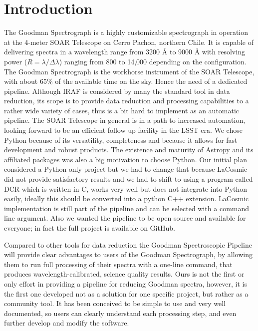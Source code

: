 \documentclass[11pt,twoside]{article}
\begin{document}
\section{Introduction}

The Goodman Spectrograph \citep{2004SPIE.5492..331C} is a highly customizable spectrograph in operation at
the 4-meter SOAR Telescope on Cerro Pachon, northern Chile.
It is capable of delivering spectra in a wavelength range from 3200 \AA{} to 9000 \AA{}
with resolving power ($R=\lambda/\Delta\lambda$) ranging from 800 to 14,000
depending on the configuration. The Goodman Spectrograph is the workhorse
instrument of the SOAR Telescope, with about 65\% of the available time on the sky.
Hence the need of a dedicated pipeline. Although IRAF is considered by many the standard tool
in data reduction, its scope is to provide data reduction and processing
capabilities to a rather wide variety of cases, thus is a bit hard to implement
as an automatic pipeline. The SOAR Telescope in general is in a path to increased automation, looking forward to be
an efficient follow up facility in the LSST era. We chose Python because of its
versatility, completeness and because it allows for fast development and
robust products. The existence and maturity of Astropy and its affiliated
packages was also a big motivation to choose Python.
Our initial plan considered a Python-only project but we had to change that
because LaCosmic \citep{2001PASP..113.1420V} did not provide satisfactory results and we had to shift
to using a program called DCR \citep{2004PASP..116..148P} which is written in C,
works very well but does not integrate into Python easily, ideally this
should be converted into a python C++ extension.
LaCosmic implementation is still part of the pipeline and can be selected with a command
line argument.
Also we wanted the pipeline to be open source and available for everyone; in fact the full
project is available on GitHub.

Compared to other tools for data reduction the Goodman Spectroscopic Pipeline
will provide clear advantages to users of the Goodman Spectrograph, by allowing
them to run full processing of their spectra with a one-line command, that produces
wavelength-calibrated, science quality results. Ours is not the first or only
effort in providing a pipeline for reducing Goodman spectra, however, it is the
first one developed not as a solution for one specific project, but rather as a community tool.
It has been conceived to be simple to use and very well documented, so users can
clearly understand each processing step, and even further develop and modify the
software.
\end{document}
